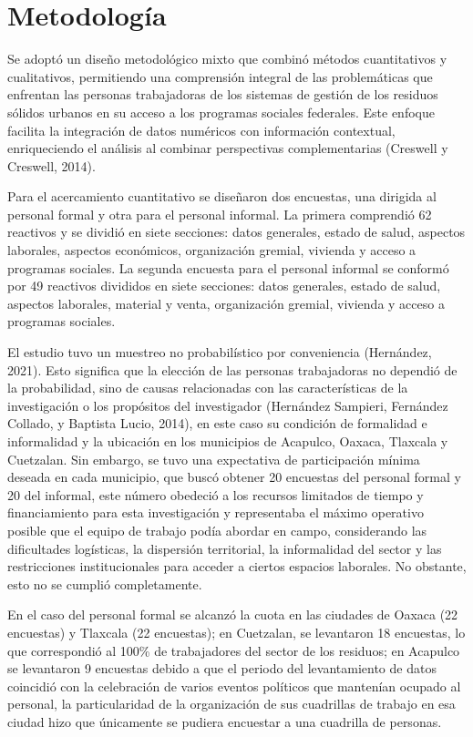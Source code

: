 \documentclass[
  spanish,
  11.5pt,
  170mm x 240mmpaper,
]{scrbook}
\begin{document}

\chapter{Metodología}\label{metodologuxeda}

Se adoptó un diseño metodológico mixto que combinó métodos cuantitativos
y cualitativos, permitiendo una comprensión integral de las
problemáticas que enfrentan las personas trabajadoras de los sistemas de
gestión de los residuos sólidos urbanos en su acceso a los programas
sociales federales. Este enfoque facilita la integración de datos
numéricos con información contextual, enriqueciendo el análisis al
combinar perspectivas complementarias (Creswell y Creswell, 2014).

Para el acercamiento cuantitativo se diseñaron dos encuestas, una
dirigida al personal formal y otra para el personal informal. La primera
comprendió 62 reactivos y se dividió en siete secciones: datos
generales, estado de salud, aspectos laborales, aspectos económicos,
organización gremial, vivienda y acceso a programas sociales. La segunda
encuesta para el personal informal se conformó por 49 reactivos
divididos en siete secciones: datos generales, estado de salud, aspectos
laborales, material y venta, organización gremial, vivienda y acceso a
programas sociales.

El estudio tuvo un muestreo no probabilístico por conveniencia
(Hernández, 2021). Esto significa que la elección de las personas
trabajadoras no dependió de la probabilidad, sino de causas relacionadas
con las características de la investigación o los propósitos del
investigador (Hernández Sampieri, Fernández Collado, y Baptista Lucio,
2014), en este caso su condición de formalidad e informalidad y la
ubicación en los municipios de Acapulco, Oaxaca, Tlaxcala y Cuetzalan.
Sin embargo, se tuvo una expectativa de participación mínima deseada en
cada municipio, que buscó obtener 20 encuestas del personal formal y 20
del informal, este número obedeció a los recursos limitados de tiempo y
financiamiento para esta investigación y representaba el máximo
operativo posible que el equipo de trabajo podía abordar en campo,
considerando las dificultades logísticas, la dispersión territorial, la
informalidad del sector y las restricciones institucionales para acceder
a ciertos espacios laborales. No obstante, esto no se cumplió
completamente.

En el caso del personal formal se alcanzó la cuota en las ciudades de
Oaxaca (22 encuestas) y Tlaxcala (22 encuestas); en Cuetzalan, se
levantaron 18 encuestas, lo que correspondió al 100\% de trabajadores
del sector de los residuos; en Acapulco se levantaron 9 encuestas debido
a que el periodo del levantamiento de datos coincidió con la celebración
de varios eventos políticos que mantenían ocupado al personal, la
particularidad de la organización de sus cuadrillas de trabajo en esa
ciudad hizo que únicamente se pudiera encuestar a una cuadrilla de
personas.
\end{document}
